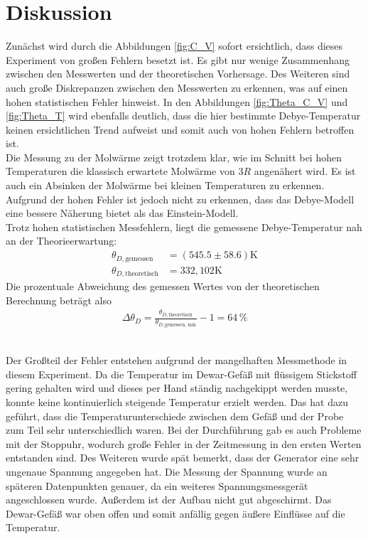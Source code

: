 \section{Diskussion}
\label{sec:Diskussion}
Zunächst wird durch die Abbildungen \ref{fig:C_V} sofort ersichtlich, dass dieses Experiment von großen Fehlern besetzt ist. 
Es gibt nur wenige Zusammenhang zwischen den Messwerten und der theoretischen Vorhersage. Des Weiteren sind 
auch große Diskrepanzen zwischen den Messwerten zu erkennen, was auf einen hohen statistischen Fehler hinweist. In den Abbildungen 
\ref{fig:Theta_C_V} und \ref{fig:Theta_T} wird ebenfalls deutlich, dass die hier bestimmte Debye-Temperatur keinen ersichtlichen Trend aufweist 
und somit auch von hohen Fehlern betroffen ist. \\
Die Messung zu der Molwärme zeigt trotzdem klar, wie im Schnitt bei hohen Temperaturen die klassisch erwartete Molwärme von $3 R$ angenähert wird. 
Es ist auch ein Absinken der Molwärme bei kleinen Temperaturen zu erkennen. Aufgrund der hohen Fehler ist jedoch nicht zu erkennen, dass das Debye-Modell eine bessere Näherung 
bietet als das Einstein-Modell.  \\

Trotz hohen statistischen Messfehlern, liegt die gemessene Debye-Temperatur nah an der Theorieerwartung:
\begin{align*}
    \theta_{D,\text{gemessen}} &= (545.5 \pm 58.6) \si{\kelvin}\\
    \theta_{D,\text{theoretisch}} &= 332,102 \si{\kelvin}
\end{align*}
Die prozentuale Abweichung des gemessen Wertes von der theoretischen Berechnung beträgt also
\begin{align*}
    \Delta \theta_D =\frac{\theta_{D,\text{theoretisch}}}{\theta_{D,\text{gemessen, min}}} -1 =  64 \,\si{\%}
\end{align*}

\\ 
Der Großteil der Fehler entstehen aufgrund der mangelhaften Messmethode in diesem Experiment. Da die Temperatur im Dewar-Gefäß mit flüssigem Stickstoff 
gering gehalten wird und dieses per Hand ständig nachgekippt werden musste, konnte keine kontinuierlich steigende Temperatur erzielt werden. 
Das hat dazu geführt, dass die Temperaturunterschiede zwischen dem Gefäß und der Probe zum Teil sehr unterschiedlich waren. 
Bei der Durchführung gab es auch Probleme mit der Stoppuhr, wodurch große Fehler in der Zeitmessung in den ersten Werten entstanden sind. Des Weiteren wurde spät bemerkt, dass der Generator eine sehr ungenaue Spannung angegeben hat. Die Messung der Spannung wurde an späteren Datenpunkten genauer, da ein weiteres Spannungsmessgerät angeschlossen wurde.   
Außerdem ist der Aufbau nicht gut abgeschirmt. Das Dewar-Gefäß war oben offen und somit anfällig gegen äußere Einflüsse auf die Temperatur. 

